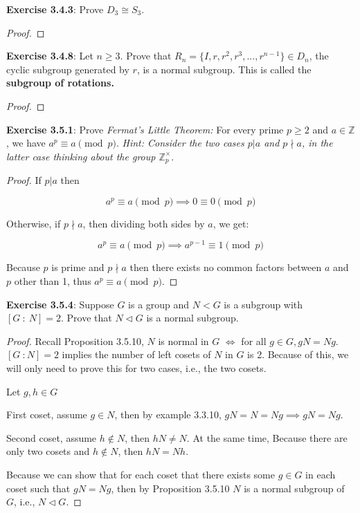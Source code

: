 \documentclass[a4paper]{article}
\begin{document}
\begin{myparindent}{0pt}
\textbf{Exercise 3.4.3}:
Prove $D_3 \cong S_3$.
\begin{proof}
\end{proof}

\textbf{Exercise 3.4.8}:
Let $n \ge 3$. Prove that $R_n = \{ I, r, r^2, r^3, ..., r^{n - 1} \} \in D_n$,
the cyclic subgroup generated by $r$, is a normal subgroup. This is called the
\textbf{subgroup of rotations.}
\begin{proof}
\end{proof}

\textbf{Exercise 3.5.1}:
Prove \textit{Fermat's Little Theorem:} For every prime $p \ge 2$ and
$a \in \mathbb{Z}$, we have $a^p \equiv a \pmod p$. \textit{Hint: Consider the
two cases $p|a$ and $p \nmid a$, in the latter case thinking about the group
$\mathbb{Z}_p^{\times}$}.
\begin{proof}
  If $p | a$ then

  \[ a^p \equiv a \pmod p \implies 0 \equiv 0 \pmod p \]

  Otherwise, if $p \nmid a$, then dividing both sides by $a$, we get:

  \[ a^p \equiv a \pmod p \implies a^{p-1} \equiv 1 \pmod p \]

  Because $p$ is prime and $p \nmid a$ then there exists no common factors
  between $a$ and $p$ other than 1, thus $a^p \equiv a \pmod p$.
\end{proof}

\textbf{Exercise 3.5.4}:
Suppose $G$ is a group and $N < G$ is a subgroup with $[G ~: ~N] = 2$. Prove
that $N \triangleleft G$ is a normal subgroup.
\begin{proof}
  Recall Proposition 3.5.10, $N$ is normal in $G$ $\iff$ for all $g \in G, gN = Ng$.
  \newline
  $[G ~: N] = 2$ implies the number of left cosets of $N$ in $G$ is 2. Because
  of this, we will only need to prove this for two cases, i.e., the two cosets.
  \newline

  Let $g, h \in G$

  First coset, assume $g \in N$, then by example 3.3.10, $gN = N = Ng \implies gN = Ng$.

  Second coset, assume $h \notin N$, then $hN \neq N$. At the same time, Because
  there are only two cosets and $h \notin N$, then $hN = Nh$. \newline

  Because we can show that for each coset that there exists some $g \in G$ in
  each coset such that $gN = Ng$, then by Proposition 3.5.10 $N$ is a normal
  subgroup of $G$, i.e., $N \triangleleft G$.
\end{proof}


\end{myparindent}
\end{document}
